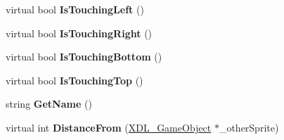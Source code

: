 \begin{DoxyCompactItemize}
\item 
\hypertarget{class_x_d_l___game_object_ae56fc6434b9e9d5e14b245c1962c8d34}{virtual bool {\bfseries Is\-Touching\-Left} ()}\label{class_x_d_l___game_object_ae56fc6434b9e9d5e14b245c1962c8d34}

\item 
\hypertarget{class_x_d_l___game_object_af75a98fbfa551585b9a8937148bc49b7}{virtual bool {\bfseries Is\-Touching\-Right} ()}\label{class_x_d_l___game_object_af75a98fbfa551585b9a8937148bc49b7}

\item 
\hypertarget{class_x_d_l___game_object_af998b19c3969a60e7bd0ef92e15db2dc}{virtual bool {\bfseries Is\-Touching\-Bottom} ()}\label{class_x_d_l___game_object_af998b19c3969a60e7bd0ef92e15db2dc}

\item 
\hypertarget{class_x_d_l___game_object_a9d15ebd7cac3965a1fe4767e2123f72e}{virtual bool {\bfseries Is\-Touching\-Top} ()}\label{class_x_d_l___game_object_a9d15ebd7cac3965a1fe4767e2123f72e}

\item 
\hypertarget{class_x_d_l___game_object_ac3f12eb6e45a10bd0b184bf1dcc0625c}{string {\bfseries Get\-Name} ()}\label{class_x_d_l___game_object_ac3f12eb6e45a10bd0b184bf1dcc0625c}

\item 
\hypertarget{class_x_d_l___game_object_a253f71b057ddf28ec397ec04ea60c590}{virtual int {\bfseries Distance\-From} (\hyperlink{class_x_d_l___game_object}{X\-D\-L\-\_\-\-Game\-Object} $\ast$\-\_\-other\-Sprite)}\label{class_x_d_l___game_object_a253f71b057ddf28ec397ec04ea60c590}

\end{DoxyCompactItemize}
